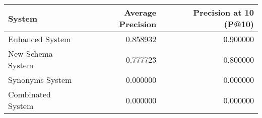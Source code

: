 \begin{tabular}{lrr}
\toprule
System & Average Precision & Precision at 10 (P@10) \\
\midrule
Enhanced System & 0.858932 & 0.900000 \\
New Schema System & 0.777723 & 0.800000 \\
Synonyms System & 0.000000 & 0.000000 \\
Combinated System & 0.000000 & 0.000000 \\
\bottomrule
\end{tabular}
